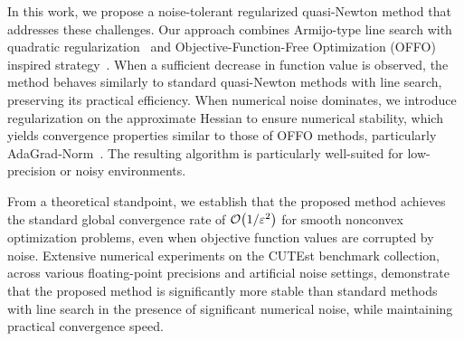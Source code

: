 \documentclass[journal]{subfiles}
\begin{document}
In this work, we propose a noise-tolerant regularized quasi-Newton method that addresses these challenges.
Our approach combines Armijo-type line search with quadratic regularization~\citep{uedaRegularizedNewtonMethod2014,kanzowRegularizationLimitedMemory2023}
and Objective-Function-Free Optimization (OFFO) inspired strategy~\citep{Gratton08022024,grattonOFFOMinimizationAlgorithms2023}.
When a sufficient decrease in function value is observed, the method behaves similarly to standard quasi-Newton methods with line search, preserving its practical efficiency.
When numerical noise dominates, we introduce regularization on the approximate Hessian to ensure numerical stability, which yields convergence properties similar to those of OFFO methods, particularly AdaGrad-Norm~\citep{wardAdaGradStepsizesSharp2020}.
The resulting algorithm is particularly well-suited for low-precision or noisy environments.

From a theoretical standpoint, we establish that the proposed method achieves the standard global convergence rate of $\order{1/\varepsilon^2}$ for smooth nonconvex optimization problems, even when objective function values are corrupted by noise.
Extensive numerical experiments on the CUTEst benchmark collection, across various floating-point precisions and artificial noise settings, demonstrate that the proposed method is significantly more stable than standard methods with line search in the presence of significant numerical noise, while maintaining practical convergence speed.

\ifSubfilesClassLoaded{
    
    
}{}
\end{document}

